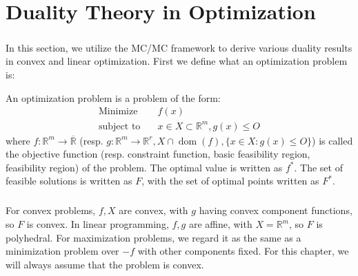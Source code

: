 \chapter{Duality Theory in Optimization}
\label{chap:04}

\paragraph{}In this section, we utilize the MC/MC framework to derive various duality results in convex and linear optimization. First we define what an optimization problem is:

\begin{defn}\label{defn:040-opt-prob}
	An optimization problem is a problem of the form:
	\begin{align*}
		\text{Minimize}\quad   & f(x)                                   \\
		\text{subject to}\quad & x\in X\subset \mathbb{R}^m, g(x)\leq O
	\end{align*}
	where $f:\mathbb{R}^m\to \overline{\mathbb{R}}$ (resp. $g:\mathbb{R}^m\to \mathbb{R}^r,X\cap \operatorname{dom}(f),\{x\in X:g(x)\leq O\}$) is called the objective function (resp. constraint function, basic feasibility region, feasibility region) of the problem. The optimal value is written as $f^\ast$. The set of feasible solutions is written as $F$, with the set of optimal points written as $F^\ast$.
\end{defn}

\paragraph{}For convex problems, $f,X$ are convex, with $g$ having convex component functions, so $F$ is convex. In linear programming, $f,g$ are affine, with $X=\mathbb{R}^m$, so $F$ is polyhedral. For maximization problems, we regard it as the same as a minimization problem over $-f$ with other components fixed. For this chapter, we will always assume that the problem is convex.








